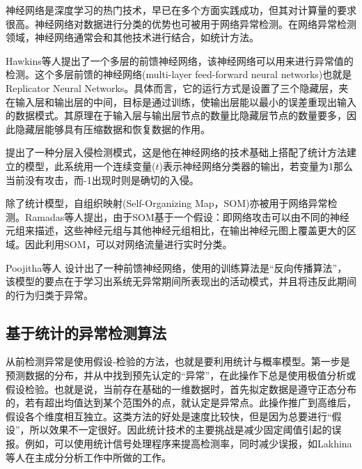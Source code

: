 神经网络是深度学习的热门技术，早已在多个方面实践成功，但其对计算量的要求很高。神经网络对数据进行分类的优势也可被用于网络异常检测。在网络异常检测领域，神经网络通常会和其他技术进行结合，如统计方法。


Hawkins等人\cite{hawk2002Outlier}提出了一个多层的前馈神经网络，该神经网络可以用来进行异常值的检测。这个多层前馈的神经网络(multi-layer feed-forward neural networks)也就是Replicator Neural Networks。具体而言，它的运行方式是设置了三个隐藏层，夹在输入层和输出层的中间，目标是通过训练，使输出层能以最小的误差重现出输入的数据模式。其原理在于输入层与输出层节点的数量比隐藏层节点的数量要多，因此隐藏层能够具有压缩数据和恢复数据的作用。



  \citet{2001HIDE} 提出了一种分层入侵检测模式，这是他在神经网络的技术基础上搭配了统计方法建立的模型，此系统用一个连续变量($t$)表示神经网络分类器的输出，若变量为1那么当前没有攻击，而-1出现时则是确切的入侵。
  
  除了统计模型，自组织映射(Self-Organizing Map，SOM)亦被用于网络异常检测。Ramadas等人\cite{2003Detecting}提出，由于SOM基于一个假设：即网络攻击可以由不同的神经元组来描述，这些神经元组与其他神经元组相比，在输出神经元图上覆盖更大的区域。因此利用SOM，可以对网络流量进行实时分类。
  
  Poojitha等人\cite{Poojitha2010} 设计出了一种前馈神经网络，使用的训练算法是“反向传播算法”，该模型的要点在于学习出系统无异常期间所表现出的活动模式，并且将违反此期间的行为归类于异常。

\subsection{基于统计的异常检测算法}
从前检测异常是使用假设-检验的方法，也就是要利用统计与概率模型。第一步是预测数据的分布，并从中找到预先认定的“异常”，在此操作下总是使用极值分析或假设检验。也就是说，当前存在基础的一维数据时，首先拟定数据是遵守正态分布的，若有超出均值达到某个范围外的点，就认定是异常点。此操作推广到高维后，假设各个维度相互独立。这类方法的好处是速度比较快，但是因为总要进行“假设”，所以效果不一定很好。因此统计技术的主要挑战是减少固定阈值引起的误报\cite{cormode2010algorithms}。例如，可以使用统计信号处理程序来提高检测率，同时减少误报，如Lakhina等人在主成分分析工作中所做的工作\cite{lakhina2004diagnosing,lakhina2004structural,lakhina2005mining}。

